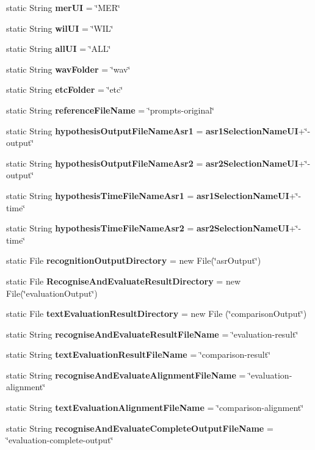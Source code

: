 \begin{DoxyCompactItemize}
\item 
static String {\bf mer\+U\+I} = \char`\"{}M\+E\+R\char`\"{}
\item 
static String {\bf wil\+U\+I} = \char`\"{}W\+I\+L\char`\"{}
\item 
static String {\bf all\+U\+I} = \char`\"{}A\+L\+L\char`\"{}
\item 
static String {\bf wav\+Folder} = \char`\"{}wav\char`\"{}
\item 
static String {\bf etc\+Folder} = \char`\"{}etc\char`\"{}
\item 
static String {\bf reference\+File\+Name} = \char`\"{}prompts-\/original\char`\"{}
\item 
static String {\bf hypothesis\+Output\+File\+Name\+Asr1} = {\bf asr1\+Selection\+Name\+U\+I}+\char`\"{}-\/output\char`\"{}
\item 
static String {\bf hypothesis\+Output\+File\+Name\+Asr2} = {\bf asr2\+Selection\+Name\+U\+I}+\char`\"{}-\/output\char`\"{}
\item 
static String {\bf hypothesis\+Time\+File\+Name\+Asr1} = {\bf asr1\+Selection\+Name\+U\+I}+\char`\"{}-\/time\char`\"{}
\item 
static String {\bf hypothesis\+Time\+File\+Name\+Asr2} = {\bf asr2\+Selection\+Name\+U\+I}+\char`\"{}-\/time\char`\"{}
\item 
static File {\bf recognition\+Output\+Directory} = new File(\char`\"{}asr\+Output\char`\"{})
\item 
static File {\bf Recognise\+And\+Evaluate\+Result\+Directory} = new File(\char`\"{}evaluation\+Output\char`\"{})
\item 
static File {\bf text\+Evaluation\+Result\+Directory} = new File (\char`\"{}comparison\+Output\char`\"{})
\item 
static String {\bf recognise\+And\+Evaluate\+Result\+File\+Name} = \char`\"{}evaluation-\/result\char`\"{}
\item 
static String {\bf text\+Evaluation\+Result\+File\+Name} = \char`\"{}comparison-\/result\char`\"{}
\item 
static String {\bf recognise\+And\+Evaluate\+Alignment\+File\+Name} = \char`\"{}evaluation-\/alignment\char`\"{}
\item 
static String {\bf text\+Evaluation\+Alignment\+File\+Name} = \char`\"{}comparison-\/alignment\char`\"{}
\item 
static String {\bf recognise\+And\+Evaluate\+Complete\+Output\+File\+Name} = \char`\"{}evaluation-\/complete-\/output\char`\"{}
\item 

\end{DoxyCompactItemize}
